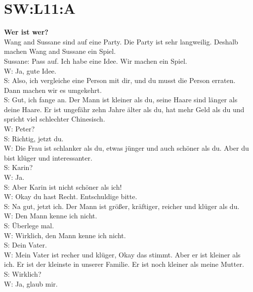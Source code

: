 \section{SW:L11:A}
\noindent
\textbf{Wer ist wer?} \\
Wang and Sussane sind auf eine Party. Die Party ist sehr langweilig.
Deshalb machen Wang and Sussane ein Spiel.  \\
Sussane: Pass auf.  Ich habe eine Idee. Wir machen ein Spiel. \\
W: Ja, gute Idee. \\
S: Also, ich vergleiche 
eine Person mit dir, und du musst die Person erraten. 
Dann machen wir es umgekehrt.  \\
S: Gut, ich fange an. Der Mann ist kleiner als du,
seine Haare sind länger als deine Haare.
Er ist ungefähr zehn Jahre älter als du, hat mehr Geld als du und spricht viel schlechter Chinesisch.  \\
W: Peter? \\
S: Richtig, jetzt du. \\
W: Die Frau ist schlanker als du, etwas jünger und auch schöner als du. Aber du bist klüger und interessanter. \\
S: Karin? \\
W: Ja. \\
S: Aber Karin ist nicht schöner als ich! \\
W: Okay du hast Recht.  Entschuldige bitte. \\
S: Na gut, jetzt ich. Der Mann ist größer, kräftiger, reicher und klüger als du. \\
W: Den Mann kenne ich nicht. \\
S: Überlege mal.  \\
W: Wirklich, den Mann kenne ich nicht. \\
S: Dein Vater. \\
W: Mein Vater ist recher und klüger, Okay das stimmt.  Aber er ist kleiner als ich.
Er ist der kleinste in unserer Familie.
Er ist noch kleiner als meine Mutter. \\
S: Wirklich? \\
W: Ja, glaub mir. \\

